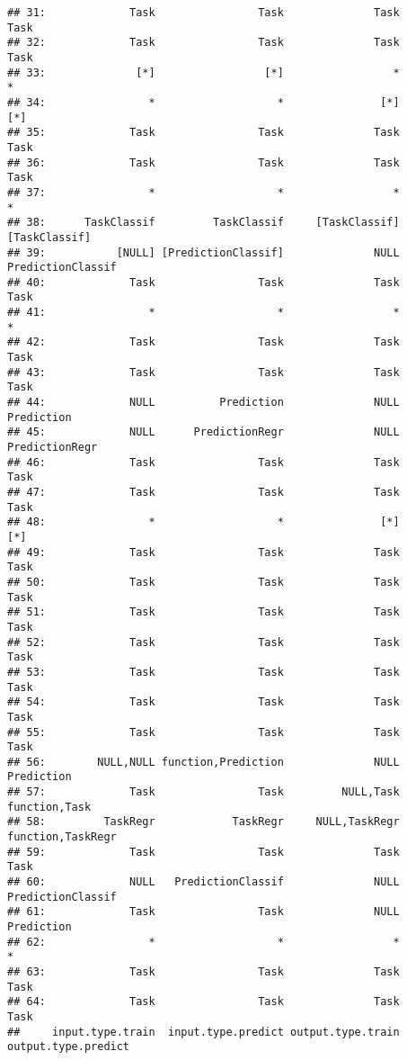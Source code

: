 \documentclass[
]{scrbook}
\begin{document}
\begin{verbatim}
## 31:             Task                Task              Task                Task
## 32:             Task                Task              Task                Task
## 33:              [*]                 [*]                 *                   *
## 34:                *                   *               [*]                 [*]
## 35:             Task                Task              Task                Task
## 36:             Task                Task              Task                Task
## 37:                *                   *                 *                   *
## 38:      TaskClassif         TaskClassif     [TaskClassif]       [TaskClassif]
## 39:           [NULL] [PredictionClassif]              NULL   PredictionClassif
## 40:             Task                Task              Task                Task
## 41:                *                   *                 *                   *
## 42:             Task                Task              Task                Task
## 43:             Task                Task              Task                Task
## 44:             NULL          Prediction              NULL          Prediction
## 45:             NULL      PredictionRegr              NULL      PredictionRegr
## 46:             Task                Task              Task                Task
## 47:             Task                Task              Task                Task
## 48:                *                   *               [*]                 [*]
## 49:             Task                Task              Task                Task
## 50:             Task                Task              Task                Task
## 51:             Task                Task              Task                Task
## 52:             Task                Task              Task                Task
## 53:             Task                Task              Task                Task
## 54:             Task                Task              Task                Task
## 55:             Task                Task              Task                Task
## 56:        NULL,NULL function,Prediction              NULL          Prediction
## 57:             Task                Task         NULL,Task       function,Task
## 58:         TaskRegr            TaskRegr     NULL,TaskRegr   function,TaskRegr
## 59:             Task                Task              Task                Task
## 60:             NULL   PredictionClassif              NULL   PredictionClassif
## 61:             Task                Task              NULL          Prediction
## 62:                *                   *                 *                   *
## 63:             Task                Task              Task                Task
## 64:             Task                Task              Task                Task
##     input.type.train  input.type.predict output.type.train output.type.predict
\end{verbatim}
\end{document}
